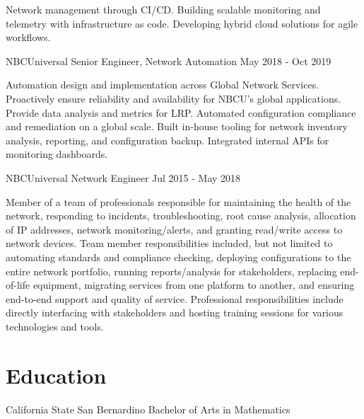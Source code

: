 \documentclass[letterpaper,11pt]{article}
\begin{document}
Network management through CI/CD.
Building scalable monitoring and telemetry with infrastructure as code.
Developing hybrid cloud solutions for agile workflows.

NBCUniversal Senior Engineer, Network Automation May 2018 - Oct 2019

Automation design and implementation across Global Network Services.
Proactively ensure reliability and availability for NBCU's global applications.
Provide data analysis and metrics for LRP.
Automated configuration compliance and remediation on a global scale.
Built in-house tooling for network inventory analysis, reporting, and configuration backup.
Integrated internal APIs for monitoring dashboards.

NBCUniversal Network Engineer Jul 2015 - May 2018

Member of a team of professionals responsible for maintaining the health of the network, responding to 
incidents, troubleshooting, root cause analysis, allocation of IP addresses, network monitoring/alerts, 
and granting read/write access to network devices.
Team member responsibilities included, but not limited to automating standards and compliance checking, 
deploying configurations to the entire network portfolio, running reports/analysis for stakeholders, 
replacing end-of-life equipment, migrating services from one platform to another, and ensuring end-to-end 
support and quality of service.
Professional responsibilities include directly interfacing with stakeholders and hosting training sessions 
for various technologies and tools.

\section{Education}

California State San Bernardino
Bachelor of Arts in Mathematics
\end{document}
